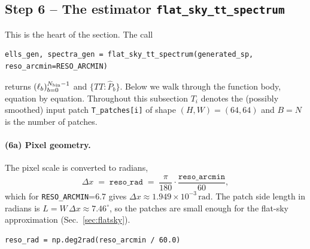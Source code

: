 \documentclass[11pt]{article}
\theoremstyle{definition}
\begin{document}
\subsection{Step 6 -- The estimator \texttt{flat\_sky\_tt\_spectrum}}
\label{sec:vf_step_estimator}

This is the heart of the section. The call
\begin{lstlisting}[style=nb]
ells_gen, spectra_gen = flat_sky_tt_spectrum(generated_sp, reso_arcmin=RESO_ARCMIN)
\end{lstlisting}
returns $(\ell_b)_{b=0}^{N_{\rm bin}-1}$ and $\{TT:\hat P_b\}$. Below we
walk through the function body, equation by equation. Throughout this
subsection $T_i$ denotes the (possibly smoothed) input patch
\texttt{T\_patches[i]} of shape $(H,W)=(64,64)$ and $B=N$ is the number of
patches.

\paragraph{(6a) Pixel geometry.} The pixel scale is converted to radians,
\begin{equation}
  \Delta x \;=\; \texttt{reso\_rad}
  \;=\; \frac{\pi}{180}\cdot\frac{\texttt{reso\_arcmin}}{60},
\end{equation}
which for \texttt{RESO\_ARCMIN}=6.7 gives $\Delta x \approx 1.949\times
10^{-3}\,\mathrm{rad}$. The patch side length in radians is $L=W\,\Delta x
\approx 7.46^\circ$, so the patches are small enough for the flat-sky
approximation (Sec.~\ref{sec:flatsky}).
\begin{lstlisting}[style=nb]
reso_rad = np.deg2rad(reso_arcmin / 60.0)
\end{lstlisting}
\end{document}
